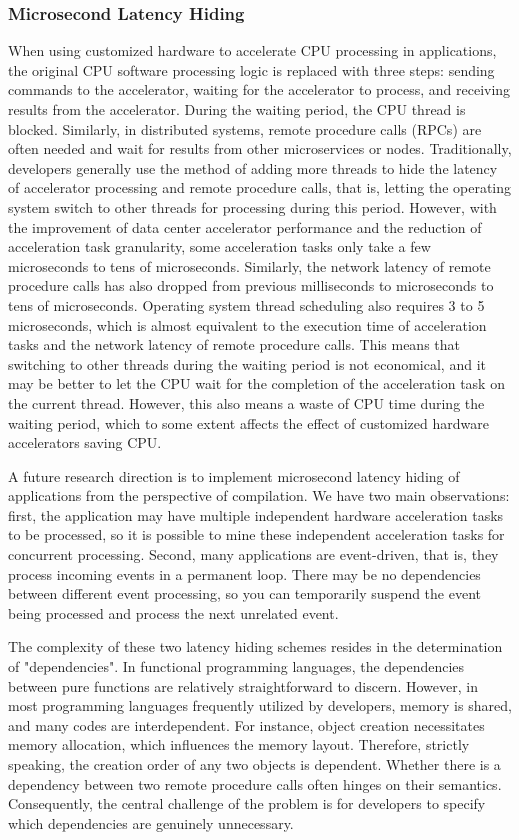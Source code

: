 \subsubsection{Microsecond Latency Hiding}
\label{future:latency-hiding}

When using customized hardware to accelerate CPU processing in applications, the original CPU software processing logic is replaced with three steps: sending commands to the accelerator, waiting for the accelerator to process, and receiving results from the accelerator. During the waiting period, the CPU thread is blocked. Similarly, in distributed systems, remote procedure calls (RPCs) are often needed and wait for results from other microservices or nodes. Traditionally, developers generally use the method of adding more threads to hide the latency of accelerator processing and remote procedure calls, that is, letting the operating system switch to other threads for processing during this period. However, with the improvement of data center accelerator performance and the reduction of acceleration task granularity, some acceleration tasks only take a few microseconds to tens of microseconds. Similarly, the network latency of remote procedure calls has also dropped from previous milliseconds to microseconds to tens of microseconds. Operating system thread scheduling also requires 3 to 5 microseconds, which is almost equivalent to the execution time of acceleration tasks and the network latency of remote procedure calls. This means that switching to other threads during the waiting period is not economical, and it may be better to let the CPU wait for the completion of the acceleration task on the current thread. However, this also means a waste of CPU time during the waiting period, which to some extent affects the effect of customized hardware accelerators saving CPU.

A future research direction is to implement microsecond latency hiding of applications from the perspective of compilation.
We have two main observations: first, the application may have multiple independent hardware acceleration tasks to be processed, so it is possible to mine these independent acceleration tasks for concurrent processing.
Second, many applications are event-driven, that is, they process incoming events in a permanent loop. There may be no dependencies between different event processing, so you can temporarily suspend the event being processed and process the next unrelated event.

The complexity of these two latency hiding schemes resides in the determination of "dependencies". In functional programming languages, the dependencies between pure functions are relatively straightforward to discern. However, in most programming languages frequently utilized by developers, memory is shared, and many codes are interdependent. For instance, object creation necessitates memory allocation, which influences the memory layout. Therefore, strictly speaking, the creation order of any two objects is dependent. Whether there is a dependency between two remote procedure calls often hinges on their semantics. Consequently, the central challenge of the problem is for developers to specify which dependencies are genuinely unnecessary.

